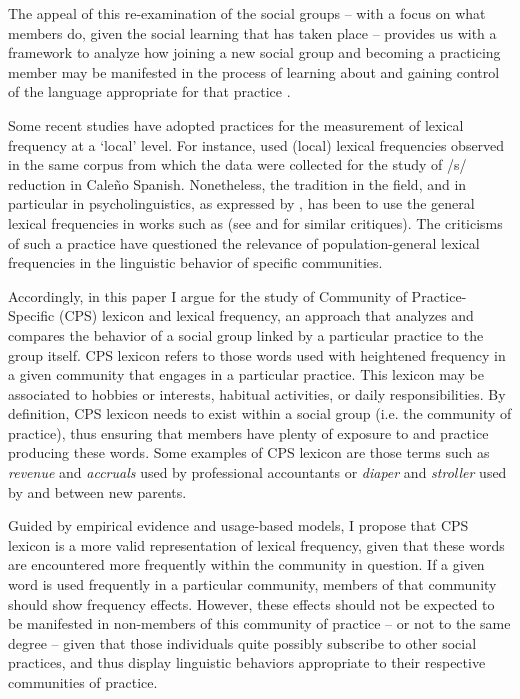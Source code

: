 \documentclass[output=paper,colorlinks,citecolor=brown,
]{langscibook}
\begin{document}
\noindent The appeal of this re-examination of the social groups -- with a focus on what members do, given the social learning that has taken place -- provides us with a framework to analyze how joining a new social group and becoming a practicing member may be manifested in the process of learning about and gaining control of the language appropriate for that practice \citep[175]{holmes1999community}.

Some recent studies \citep[e.g.][]{file2011gradient,erker2012role,linford2013lexical} have adopted practices for the measurement of lexical frequency at a `local' level. For instance, \citeauthor{file2011gradient} used (local) lexical frequencies observed in the same corpus from which the data were collected for the study of /s/ reduction in Cale{\~n}o Spanish. Nonetheless, the tradition in the field, and in particular in psycholinguistics, as expressed by \citet{brysbaert2009moving}, has been to use the general lexical frequencies in works such as \citet{kucera1967computational} (see \citealt{burgess1998effect} and \citealt{erker2012role} for similar critiques). The criticisms of such a practice have questioned the relevance of population-general lexical frequencies in the linguistic behavior of specific communities. 

Accordingly, in this paper I argue for the study of Community of Practice-Specific (CPS) lexicon and lexical frequency, an approach that analyzes and compares the behavior of a social group linked by a particular practice to the group itself. CPS lexicon refers to those words used with heightened frequency in a given community that engages in a particular practice. This lexicon may be associated to hobbies or interests, habitual activities, or daily responsibilities. By definition, CPS lexicon needs to exist within a social group (i.e. the community of practice), thus ensuring that members have plenty of exposure to and practice producing these words. Some examples of CPS lexicon are those terms such as \textit{revenue} and \textit{accruals} used by professional accountants or \textit{diaper} and \textit{stroller} used by and between new parents. 

Guided by empirical evidence and usage-based models, I propose that CPS lexicon is a more valid representation of lexical frequency, given that these words are encountered more frequently within the community in question. If a given word is used frequently in a particular community, members of that community should show frequency effects. However, these effects should not be expected to be manifested in non-members of this community of practice -- or not to the same degree -- given that those individuals quite possibly subscribe to other social practices, and thus display linguistic behaviors appropriate to their respective communities of practice.
\end{document}
